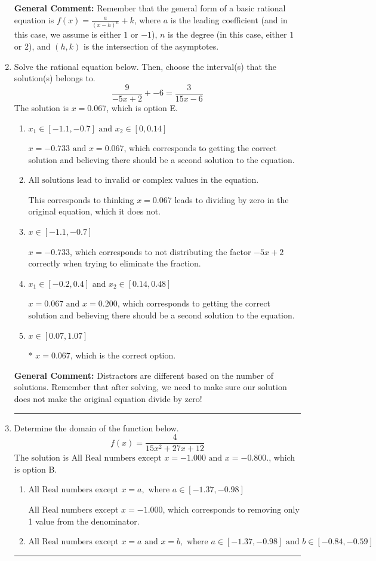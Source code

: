\documentclass{extbook}[14pt]
\newcommand{\litem}[1]{\item #1

\rule{\textwidth}{0.4pt}}
\begin{document}
\begin{enumerate}
{\textbf{General Comment:} Remember that the general form of a basic rational equation is $ f(x) = \frac{a}{(x-h)^n} + k$, where $a$ is the leading coefficient (and in this case, we assume is either $1$ or $-1$), $n$ is the degree (in this case, either $1$ or $2$), and $(h, k)$ is the intersection of the asymptotes.
}
\litem{
Solve the rational equation below. Then, choose the interval(s) that the solution(s) belongs to.
\[ \frac{9}{-5x + 2} + -6 = \frac{3}{15x -6} \]
The solution is \( x = 0.067 \), which is option E.\begin{enumerate}[label=\Alph*.]
\item \( x_1 \in [-1.1, -0.7] \text{ and } x_2 \in [0,0.14] \)

$x = -0.733 \text{ and } x = 0.067$, which corresponds to getting the correct solution and believing there should be a second solution to the equation.
\item \( \text{All solutions lead to invalid or complex values in the equation.} \)

This corresponds to thinking $x = 0.067$ leads to dividing by zero in the original equation, which it does not.
\item \( x \in [-1.1,-0.7] \)

$x = -0.733$, which corresponds to not distributing the factor $-5x + 2$ correctly when trying to eliminate the fraction.
\item \( x_1 \in [-0.2, 0.4] \text{ and } x_2 \in [0.14,0.48] \)

$x = 0.067 \text{ and } x = 0.200$, which corresponds to getting the correct solution and believing there should be a second solution to the equation.
\item \( x \in [0.07,1.07] \)

* $x = 0.067$, which is the correct option.
\end{enumerate}

\textbf{General Comment:} Distractors are different based on the number of solutions. Remember that after solving, we need to make sure our solution does not make the original equation divide by zero!
}
\litem{
Determine the domain of the function below.
\[ f(x) = \frac{4}{15x^{2} +27 x + 12} \]
The solution is \( \text{All Real numbers except } x = -1.000 \text{ and } x = -0.800. \), which is option B.\begin{enumerate}[label=\Alph*.]
\item \( \text{All Real numbers except } x = a, \text{ where } a \in [-1.37, -0.98] \)

All Real numbers except $x = -1.000$, which corresponds to removing only 1 value from the denominator.
\item \( \text{All Real numbers except } x = a \text{ and } x = b, \text{ where } a \in [-1.37, -0.98] \text{ and } b \in [-0.84, -0.59] \)


\end{enumerate}}
\end{enumerate}
\end{document}
